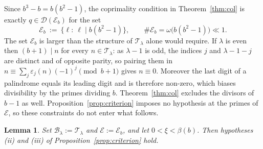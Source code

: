 \documentclass[11pt,a4paper]{article}
\theoremstyle{plain}
\newtheorem{lemma}[theorem]{Lemma}
\theoremstyle{definition}
\newcommand{\eps}{\varepsilon}
\numberwithin{equation}{section}
\begin{document}
Since $b^{3}-b=b(b^{2}-1)$, the coprimality condition in Theorem~\ref{thm:col} is exactly
$q\in\mathcal D(\mathcal E_b)$ for the set
\begin{equation}\label{eq:defE}
\mathcal E_b\ :=\ \bigl\{\ell:\ \ell\mid b(b^{2}-1)\bigr\},\qquad
\#\mathcal E_b=\omega\bigl(b(b^{2}-1)\bigr)\ll1 .
\end{equation}
The set $\mathcal E_b$ is larger than the structure of $\mathcal T_\lambda$ alone would require. If
$\lambda$ is even then $(b+1)\mid n$ for every $n\in\mathcal T_\lambda$: as $\lambda-1$ is odd, the indices
$j$ and $\lambda-1-j$ are distinct and of opposite parity, so pairing them in
$n\equiv\sum_j\eps_j(n)(-1)^{j}\pmod{b+1}$ gives $n\equiv0$. Moreover the last digit of a palindrome
equals its leading digit and is therefore non-zero, which biases divisibility by the primes dividing
$b$. Theorem~\ref{thm:col} excludes the divisors of $b-1$ as
well. Proposition~\ref{prop:criterion} imposes no hypothesis at the primes of $\mathcal E$, so these
constraints do not enter what follows.

\begin{lemma}\label{lem:palhyp}
Set $\mathcal B_\lambda:=\mathcal T_\lambda$ and $\mathcal E:=\mathcal E_b$, and
let $0<\xi<\beta(b)$. Then hypotheses \textup{(ii)} and \textup{(iii)} of
Proposition~\ref{prop:criterion} hold.
\end{lemma}
\end{document}
